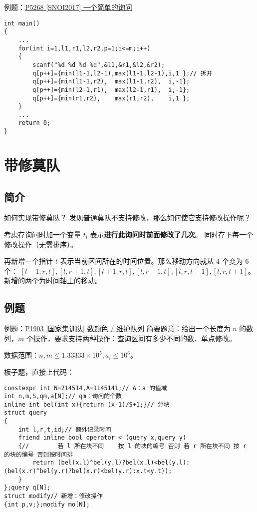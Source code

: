 \documentclass[table]{beamer}
\begin{document}
\begin{frame}[fragile]{例题：{\color{blue}\href{https://www.luogu.com.cn/problem/P5268}{P5268 [SNOI2017] 一个简单的询问}}}
\tiny
\begin{verbatim}
int main()
{
    ...
    for(int i=1,l1,r1,l2,r2,p=1;i<=m;i++)
    {
        scanf("%d %d %d %d",&l1,&r1,&l2,&r2);
        q[p++]={min(l1-1,l2-1),max(l1-1,l2-1),i,1 };// 拆开
        q[p++]={min(l1-1,r2),  max(l1-1,r2),  i,-1};
        q[p++]={min(l2-1,r1),  max(l2-1,r1),  i,-1};
        q[p++]={min(r1,r2),    max(r1,r2),    i,1 };
    }
    ...
    return 0;
}
\end{verbatim}
\end{frame}

\section{带修莫队}

\subsection{简介}
\begin{frame}{如何实现带修莫队？}
	发现普通莫队不支持修改，那么如何使它支持修改操作呢？

	考虑存询问时加一个变量 $t_i$ 表示\textbf{进行此询问时前面修改了几次}。
	同时存下每一个修改操作（无需排序）。

	再新增一个指针 $t$ 表示当前区间所在的时间位置。那么移动方向就从 $4$ 个变为 $6$ 个：
	$[l-1,r,t],[l,r+1,t],[l+1,r,t],[l,r-1,t],[l,r,t-1],[l,r,t+1]$。新增的两个为时间轴上的移动。
\end{frame}

\subsection{例题}
\begin{frame}[fragile]{例题：{\color{blue}\href{https://www.luogu.com.cn/problem/P1903}{P1903 [国家集训队] 数颜色 / 维护队列}}}
	简要题意：给出一个长度为 $n$ 的数列，$m$ 个操作，要求支持两种操作：查询区间有多少不同的数、单点修改。

	数据范围：$n,m\le 1.33333\times 10^5,a_i\le 10^6$。
	\pause

	板子题，直接上代码：\tiny
\begin{verbatim}
constexpr int N=214514,A=1145141;// A：a 的值域
int n,m,S,qm,a[N];// qm：询问的个数
inline int bel(int x){return (x-1)/S+1;}// 分块
struct query
{
    int l,r,t,id;// 额外记录时间
    friend inline bool operator < (query x,query y)
    {//        若 l 所在块不同    按 l 的块的编号 否则 若 r 所在块不同 按 r 的块的编号 否则按时间排
        return (bel(x.l)^bel(y.l)?bel(x.l)<bel(y.l):(bel(x.r)^bel(y.r)?bel(x.r)<bel(y.r):x.t<y.t));
    }
};query q[N];
struct modify// 新增：修改操作
{int p,v;};modify mo[N];
\end{verbatim}
\end{frame}
\end{document}
